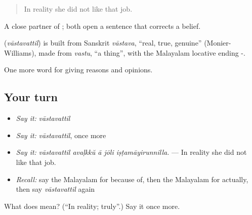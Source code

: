 \begin{quote}
In reality she did not like that job.
\end{quote}

A close partner of ; both open a sentence that corrects a belief.

\begin{cousinweb}
\textbf{} (\emph{vāstavattil}) is built from Sanskrit \emph{vāstava}, \textquotedblleft{}real, true, genuine\textquotedblright{} (Monier-Williams), made from \emph{vastu}, \textquotedblleft{}a thing\textquotedblright{}, with the Malayalam locative ending -.
\end{cousinweb}

\begin{grammarlens}[title={What you've built}]
One more word for giving reasons and opinions.
\end{grammarlens}

\subsection*{Your turn}
\begin{itemize}
\raggedright
  \item \emph{Say it:} \emph{vāstavattil}
  \item \emph{Say it:} \emph{vāstavattil}, once more
  \item \emph{Say it:} \emph{vāstavattil avaḷkkŭ ā jōli iṣṭamāyirunnilla.} — In reality she did not like that job.
  \item \emph{Recall:} say the Malayalam for because of, then the Malayalam for actually, then say \emph{vāstavattil} again
\end{itemize}

\begin{tcolorbox}[breakable,colback=teal!4,colframe=teal!35!black,title={Before you move on}]
What does  mean? (\textquotedblleft{}In reality; truly\textquotedblright{}.) Say it once more.
\end{tcolorbox}
